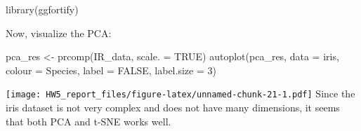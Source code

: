 \documentclass[
]{article}
\newenvironment{Shaded}{\begin{snugshade}}{\end{snugshade}}
\newcommand{\AttributeTok}[1]{\textcolor[rgb]{0.77,0.63,0.00}{#1}}
\newcommand{\ConstantTok}[1]{\textcolor[rgb]{0.00,0.00,0.00}{#1}}
\newcommand{\DecValTok}[1]{\textcolor[rgb]{0.00,0.00,0.81}{#1}}
\newcommand{\FunctionTok}[1]{\textcolor[rgb]{0.00,0.00,0.00}{#1}}
\newcommand{\NormalTok}[1]{#1}
\newcommand{\OtherTok}[1]{\textcolor[rgb]{0.56,0.35,0.01}{#1}}
\newcommand{\StringTok}[1]{\textcolor[rgb]{0.31,0.60,0.02}{#1}}
\begin{document}
\begin{Shaded}
\begin{Highlighting}[]
\FunctionTok{library}\NormalTok{(ggfortify)}
\end{Highlighting}
\end{Shaded}

Now, visualize the PCA:

\begin{Shaded}
\begin{Highlighting}[]
\NormalTok{pca\_res }\OtherTok{\textless{}{-}} \FunctionTok{prcomp}\NormalTok{(IR\_data, }\AttributeTok{scale. =} \ConstantTok{TRUE}\NormalTok{)}
\FunctionTok{autoplot}\NormalTok{(pca\_res, }\AttributeTok{data =}\NormalTok{ iris, }\AttributeTok{colour =} \StringTok{\textquotesingle{}Species\textquotesingle{}}\NormalTok{, }\AttributeTok{label =} \ConstantTok{FALSE}\NormalTok{, }\AttributeTok{label.size =} \DecValTok{3}\NormalTok{)}
\end{Highlighting}
\end{Shaded}

\texttt{[image: HW5\_report\_files/figure-latex/unnamed-chunk-21-1.pdf]}
Since the iris dataset is not very complex and does not have many
dimensions, it seems that both PCA and t-SNE works well.
\end{document}
